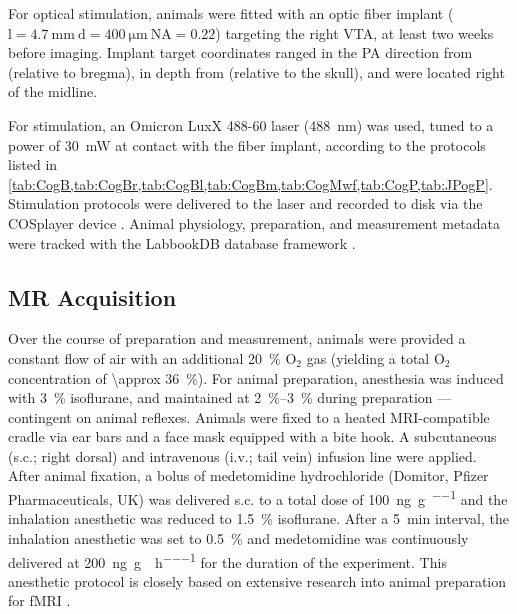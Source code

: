 For optical stimulation, animals were fitted with an optic fiber implant ($\mathrm{l=\SI{4.7}{\milli\meter} \ d=\SI{400}{\micro\meter} \ NA=0.22}$) targeting the right VTA, at least two weeks before imaging.
Implant target coordinates ranged in the PA direction from
 (relative to bregma),
in depth from
 (relative to the skull),
and were located
right of the midline.

For stimulation, an Omicron LuxX 488-60 laser (\SI{488}{\nano\meter}) was used, tuned to a power of \SI{30}{\milli\watt} at contact with the fiber implant, according to the protocols listed in \cref{tab:CogB,tab:CogBr,tab:CogBl,tab:CogBm,tab:CogMwf,tab:CogP,tab:JPogP}.
Stimulation protocols were delivered to the laser and recorded to disk via the COSplayer device \cite{cosplay}.
Animal physiology, preparation, and measurement metadata were tracked with the LabbookDB database framework \cite{ldb}.

\subsection{MR Acquisition}

Over the course of preparation and measurement, animals were provided a constant flow of air with an additional \SI{20}{\percent} $\mathrm{O_2}$ gas (yielding a total $\mathrm{O_2}$ concentration of \SI{\approx 36}{\percent}).
For animal preparation, anesthesia was induced with \SI{3}{\percent} isoflurane, and maintained at \SIrange{2}{3}{\percent} during preparation --- contingent on animal reflexes.
Animals were fixed to a heated MRI-compatible cradle via ear bars and a face mask equipped with a bite hook.
A subcutaneous (s.c.; right dorsal) and intravenous (i.v.; tail vein) infusion line were applied.
After animal fixation, a bolus of medetomidine hydrochloride (Domitor, Pfizer Pharmaceuticals, UK) was delivered s.c. to a total dose of \SI{100}{\nano\gram\per\gram\per\BW} and the inhalation anesthetic was reduced to \SI{1.5}{\percent} isoflurane.
After a \SI{5}{\minute} interval, the inhalation anesthetic was set to \SI{0.5}{\percent} and medetomidine was continuously delivered at \SI{200}{\nano\gram\per\gram\per\BW\per\hour} for the duration of the experiment.
This anesthetic protocol is closely based on extensive research into animal preparation for fMRI \cite{Grandjean2014}.

